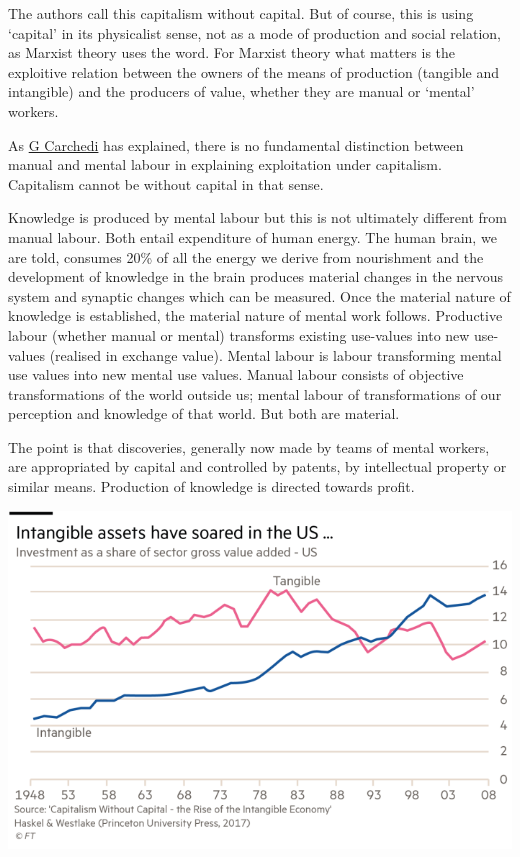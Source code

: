 \documentclass[
]{book}
\begin{document}
The authors call this capitalism without capital. But of course, this is using `capital' in its physicalist sense, not as a mode of production and social relation, as Marxist theory uses the word. For Marxist theory what matters is the exploitive relation between the owners of the means of production (tangible and intangible) and the producers of value, whether they are manual or `mental' workers.

As \href{https://thenextrecession.files.wordpress.com/2017/12/old_wine_new_bottles_the_internet.docx}{G Carchedi} has explained, there is no fundamental distinction between manual and mental labour in explaining exploitation under capitalism. Capitalism cannot be without capital in that sense.

Knowledge is produced by mental labour but this is not ultimately different from manual labour. Both entail expenditure of human energy. The human brain, we are told, consumes 20\% of all the energy we derive from nourishment and the development of knowledge in the brain produces material changes in the nervous system and synaptic changes which can be measured. Once the material nature of knowledge is established, the material nature of mental work follows. Productive labour (whether manual or mental) transforms existing use-values into new use-values (realised in exchange value). Mental labour is labour transforming mental use values into new mental use values. Manual labour consists of objective transformations of the world outside us; mental labour of transformations of our perception and knowledge of that world. But both are material.

The point is that discoveries, generally now made by teams of mental workers, are appropriated by capital and controlled by patents, by intellectual property or similar means. Production of knowledge is directed towards profit.

\includegraphics{fig/intangible.png}
\end{document}
